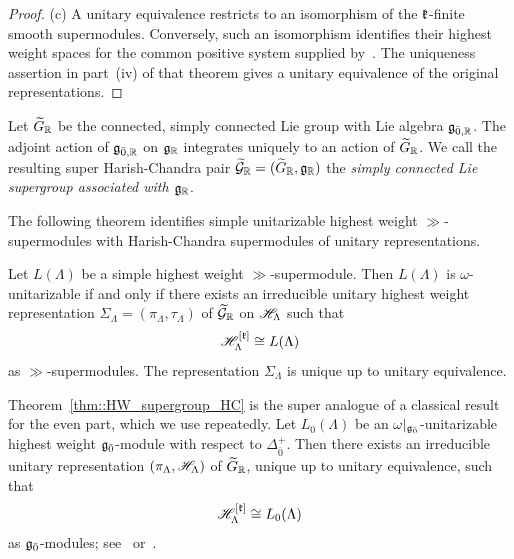 \begin{proof}
(c) A unitary equivalence restricts to an isomorphism of the ${\mathfrak k}$-finite smooth supermodules. Conversely, such an isomorphism identifies their highest weight spaces for the common positive system supplied by~\cite[Theorem~7.3.2]{neeb2011lie}. The uniqueness assertion in part~(iv) of that theorem gives a unitary equivalence of the original representations.
\end{proof}

Let $\widetilde{G}_{{\mathbb R}}$ be the connected, simply connected Lie group with Lie algebra ${\mathfrak{g}}_{\bar0,{\mathbb R}}$. The adjoint action of ${\mathfrak{g}}_{\bar0,{\mathbb R}}$ on ${\mathfrak{g}}_{{\mathbb R}}$ integrates uniquely to an action of $\widetilde{G}_{{\mathbb R}}$. We call the resulting super Harish-Chandra pair
$
\widetilde{{\mathcal{G}}}_{{\mathbb R}}=(\widetilde{G}_{{\mathbb R}},{\mathfrak{g}}_{{\mathbb R}})
$
the \emph{simply connected Lie supergroup associated with ${\mathfrak{g}}_{{\mathbb R}}$}.

The following theorem identifies simple unitarizable highest weight $\gg$-supermodules with Harish-Chandra supermodules of unitary representations.

\begin{theorem}
\label{thm::HW_supergroup_HC}
Let $L(\Lambda)$ be a simple highest weight $\gg$-supermodule. Then $L(\Lambda)$ is $\omega$-unitarizable if and only if there exists an irreducible unitary highest weight representation $\Sigma_{\Lambda}=(\pi_{\Lambda},\tau_{\Lambda})$ of $\widetilde{{\mathcal{G}}}_{{\mathbb R}}$ on ${\mathscr{H}}_{\Lambda}$ such that
\begin{equation}
{\mathscr{H}}_{\Lambda}^{[{\mathfrak k}]}
\cong
L(\Lambda)
\end{equation}
as $\gg$-supermodules. The representation $\Sigma_{\Lambda}$ is unique up to unitary equivalence.
\end{theorem}

    \begin{remark}
\label{rem::even_globalization}
Theorem~\ref{thm::HW_supergroup_HC} is the super analogue of a classical result for the
even part, which we use repeatedly. Let $L_{0}(\Lambda)$ be an $\omega|_{{\mathfrak{g}_{\bar{0}}}}$-unitarizable
highest weight ${\mathfrak{g}_{\bar{0}}}$-module with respect to $\Delta_{\bar0}^{+}$. Then there exists an
irreducible unitary representation $(\pi_{\Lambda},{\mathscr{H}}_{\Lambda})$ of $\widetilde{G}_{{\mathbb R}}$,
unique up to unitary equivalence, such that
\[
{\mathscr{H}}_{\Lambda}^{[{\mathfrak k}]}\cong L_{0}(\Lambda)
\]
as ${\mathfrak{g}_{\bar{0}}}$-modules; see~\cite[Theorem~X.2.8]{NeebHW} or~\cite[Theorem~6]{Carmeli_Fioresi_Varadarajan_Unitary}. 
\end{remark}

